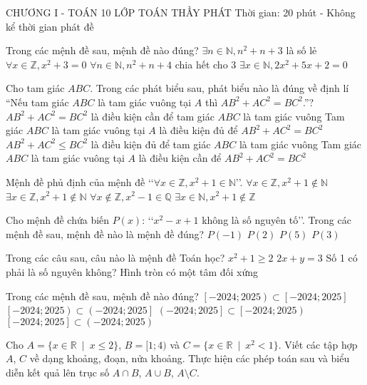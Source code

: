 \begin{name}
	{\tenchude}
	{CHƯƠNG I - TOÁN 10}
	{LỚP TOÁN THẦY PHÁT}
	{Thời gian: 20 phút - Không kể thời gian phát đề}
\end{name}

\TN
\begin{ex}
Trong các mệnh đề sau, mệnh đề nào đúng?
\choice
{$\exists n\in \mathbb{N},n^2+n+3$ là số lẻ}
{$\forall x\in \mathbb{Z},x^2+3=0$}
{$\forall n\in \mathbb{N},n^2+n+4$ chia hết cho 3}
{$\exists x\in \mathbb{N},2x^2+5x+2=0$}
\end{ex}
\begin{ex}
Cho tam giác $ABC$. Trong các phát biểu sau, phát biểu nào là đúng về định lí “Nếu tam giác $ABC$ là tam giác vuông tại $A$ thì $AB^2+AC^2=BC^2$.”?
\choice
{$AB^2+AC^2=BC^2$ là điều kiện cần để tam giác $ABC$ là tam giác vuông}
{Tam giác $ABC$ là tam giác vuông tại $A$ là điều kiện đủ để $AB^2+AC^2= BC^2$}
{$AB^2+AC^2 \le BC^2$ là điều kiện đủ để tam giác $ABC$ là tam giác vuông}
{Tam giác $ABC$ là tam giác vuông tại $A$ là điều kiện cần để $AB^2+AC^2=BC^2$}
\end{ex}
\begin{ex}
Mệnh đề phủ định của mệnh đề \lq\lq  $\forall x\in \mathbb{Z},x^2+1\in \mathbb{N}$\rq\rq.
\choice
{$\forall x\in \mathbb{Z},x^2+1\notin \mathbb{N}$}
{$\exists x\in \mathbb{Z},x^2+1\notin \mathbb{N}$}
{$\forall x\notin \mathbb{Z},x^2-1\in \mathbb{Q}$}
{$\exists x\in \mathbb{N},x^2+1\notin \mathbb{Z}$}
\end{ex}
\begin{ex}
Cho mệnh đề chứa biến $P(x)$: \lq\lq $x^2-x+1$ không là số nguyên tố\rq\rq. Trong các mệnh đề sau, mệnh đề nào là mệnh đề đúng?
\choice
{$P(-1)$}
{$P(2)$}
{$P(5)$}
{$P(3)$}
\end{ex}
\begin{ex}
Trong các câu sau, câu nào là mệnh đề Toán học?
\choice
{$x^2+1\ge 2$}
{$2x+y=3$}
{Số 1 có phải là số nguyên không?}
{Hình tròn có một tâm đối xứng}
\end{ex}
\begin{ex}
Trong các mệnh đề sau, mệnh đề nào đúng? 
\choice
{$\left[-2024;2025\right)\subset \left[-2024;2025\right]$}
{$\left[-2024;2025\right)\subset \left(-2024;2025\right]$}
{$\left(-2024;2025\right]\subset \left[-2024;2025\right)$}
{$\left[-2024;2025\right]\subset \left(-2024;2025\right)$}
\end{ex}
\TL
\begin{ex}
Cho $A=\{x \in \mathbb{R}\ \mid\ x\le 2 \}$, $B=[1;4)$ và $C=\{x \in \mathbb{R}\ \mid\ x^2<1\}$. Viết các tập hợp $A$, $C$ về dạng khoảng, đoạn, nửa khoảng. Thực hiện các phép toán sau và biểu diễn kết quả lên trục số $A\cap B$, $A\cup B$, $A\setminus C$.
\end{ex}

